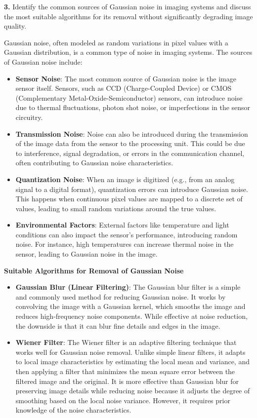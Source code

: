 \documentclass[hidelinks,12pt]{article}
\begin{document}
	
	
	 \textbf{3.} Identify the common sources of Gaussian noise in imaging systems and discuss the most suitable algorithms for its removal without significantly degrading image quality.
	
	
	Gaussian noise, often modeled as random variations in pixel values with a Gaussian distribution, is a common type of noise in imaging systems. The sources of Gaussian noise include:
	
	\begin{itemize}
		\item \textbf{Sensor Noise}: The most common source of Gaussian noise is the image sensor itself. Sensors, such as CCD (Charge-Coupled Device) or CMOS (Complementary Metal-Oxide-Semiconductor) sensors, can introduce noise due to thermal fluctuations, photon shot noise, or imperfections in the sensor circuitry.
		\item \textbf{Transmission Noise}: Noise can also be introduced during the transmission of the image data from the sensor to the processing unit. This could be due to interference, signal degradation, or errors in the communication channel, often contributing to Gaussian noise characteristics.
		\item \textbf{Quantization Noise}: When an image is digitized (e.g., from an analog signal to a digital format), quantization errors can introduce Gaussian noise. This happens when continuous pixel values are mapped to a discrete set of values, leading to small random variations around the true values.
		\item \textbf{Environmental Factors}: External factors like temperature and light conditions can also impact the sensor's performance, introducing random noise. For instance, high temperatures can increase thermal noise in the sensor, leading to Gaussian noise in the image.
	\end{itemize}
	
	 \textbf{Suitable Algorithms for Removal of Gaussian Noise}
	
	\begin{itemize}
		\item \textbf{Gaussian Blur (Linear Filtering)}: The Gaussian blur filter is a simple and commonly used method for reducing Gaussian noise. It works by convolving the image with a Gaussian kernel, which smooths the image and reduces high-frequency noise components. While effective at noise reduction, the downside is that it can blur fine details and edges in the image.
		\item \textbf{Wiener Filter}: The Wiener filter is an adaptive filtering technique that works well for Gaussian noise removal. Unlike simple linear filters, it adapts to local image characteristics by estimating the local mean and variance, and then applying a filter that minimizes the mean square error between the filtered image and the original. It is more effective than Gaussian blur for preserving image details while reducing noise because it adjusts the degree of smoothing based on the local noise variance. However, it requires prior knowledge of the noise characteristics.
	\end{itemize}
	
\end{document}
